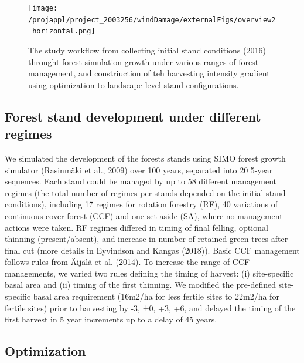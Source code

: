 \documentclass[]{elsarticle} %
\begin{document}
\begin{figure}
\centering
\texttt{[image: /projappl/project\_2003256/windDamage/externalFigs/overview2\_horizontal.png]}
\caption{The study workflow from collecting initial stand conditions (2016) throught forest simulation growth under various ranges of forest management, and constriuction of teh harvesting intensity gradient using optimization to landscape level stand configurations.\label{workflow}}
\end{figure}

\hypertarget{forest-stand-development-under-different-regimes}{%
\subsection{Forest stand development under different regimes}\label{forest-stand-development-under-different-regimes}}

We simulated the development of the forests stands using SIMO forest growth simulator (Rasinmäki et al., 2009) over 100 years, separated into 20 5-year sequences. Each stand could be managed by up to 58 different management regimes (the total number of regimes per stands depended on the initial stand conditions), including 17 regimes for rotation forestry (RF), 40 variations of continuous cover forest (CCF) and one set-aside (SA), where no management actions were taken. RF regimes differed in timing of final felling, optional thinning (present/absent), and increase in number of retained green trees after final cut (more details in Eyvindson and Kangas (2018)). Basic CCF management follows rules from Äijälä et al. (2014). To increase the range of CCF managements, we varied two rules defining the timing of harvest: (i) site-specific basal area and (ii) timing of the first thinning. We modified the pre-defined site-specific basal area requirement (16m2/ha for less fertile sites to 22m2/ha for fertile sites) prior to harvesting by -3, ±0, +3, +6, and delayed the timing of the first harvest in 5 year increments up to a delay of 45 years.

\hypertarget{optimization}{%
\subsection{Optimization}\label{optimization}}
\end{document}
